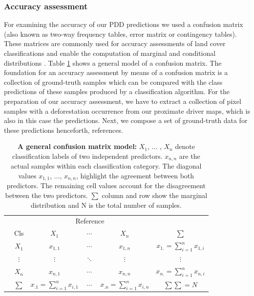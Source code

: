 		\subsubsection{Accuracy assessment}
			For examining the accuracy of our \ac{PDD} predictions we used a confusion matrix (also known as two-way frequency tables, error matrix or contingency tables). These matrices are commonly used for accuracy assessments of land cover classifications and enable the computation of marginal and conditional distributions \citep{Congalton1991,Foody2002}. Table \ref{tab:methods_confusion_matrix} shows a general model of a confusion matrix. The foundation for an accuracy assessment by means of a confusion matrix is a collection of ground-truth samples which can be compared with the class predictions of these samples produced by a classification algorithm. For the preparation of our accuracy assessment, we have to extract a collection of pixel samples with a deforestation occurrence from our proximate driver maps, which is also in this case the predictions. Next, we compose a set of ground-truth data for these predictions henceforth, references.
			\begin{table}[ht]
				\centering
				\caption[A general confusion matrix model]{\textbf{A general confusion matrix model:} $X_1$, ... , $X_n$ denote classification labels of two independent predictors. $x_{n,n}$ are the actual samples within each classification category. The diagonal values $x_{1,1}$, ..., $x_{n,n}$, highlight the agreement between both predictors. The remaining cell values account for the disagreement between the two predictors. $\sum$ column and row show the marginal distribution and N is the total number of samples.}
				\label{tab:methods_confusion_matrix}
				\begin{tabular}{lccccc}
					\hline
					& & \multicolumn{3}{c}{Reference} & \\
					& Cls & $X_1$ & $\cdots$ & $X_n$ & $\sum$ \\\hline
					\multirow{4}{*}{\STAB{\rotatebox[origin=c]{90}{Predict}}}
					& $X_1$ & $x_{1,1}$ & $\cdots$ & $x_{1,n}$ & $x_{1.}=
					\displaystyle\sum_{i=1}^{n} x_{1,i}$ \\ 
					& $\vdots$ & $\vdots$ & $\ddots$ & $\vdots$ & $\vdots$ \\ 
					& $X_n$ & $x_{n,1}$ & $\cdots$ & $x_{n,n}$ & $x_{n.}=\displaystyle\sum_{i=1}^{n}x_{n,i}$ \\\hline 
					& $\sum$ & $x_{.1}=\displaystyle\sum_{i=1}^{n}x_{i,1}$ & $\cdots$ & $x_{.n}=\displaystyle\sum_{i=1}^{n}x_{i,n}$ & $\sum\sum=N$ \\\hline
				\end{tabular}
			\end{table}

